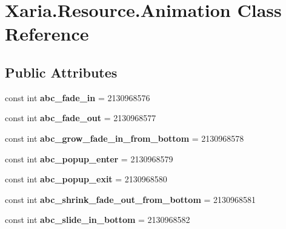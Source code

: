 \hypertarget{classXaria_1_1Resource_1_1Animation}{}\section{Xaria.\+Resource.\+Animation Class Reference}
\label{classXaria_1_1Resource_1_1Animation}
\subsection*{Public Attributes}
\begin{DoxyCompactItemize}
\item 
\mbox{\label{classXaria_1_1Resource_1_1Animation_a0caef95520f8407d50a7669f2417f583}} 
const int {\bfseries abc\+\_\+fade\+\_\+in} = 2130968576
\item 
\mbox{\label{classXaria_1_1Resource_1_1Animation_a36c091199021a97835a4d0897899b0d7}} 
const int {\bfseries abc\+\_\+fade\+\_\+out} = 2130968577
\item 
\mbox{\label{classXaria_1_1Resource_1_1Animation_a334d9047a5ee34f2c2b49a758719c622}} 
const int {\bfseries abc\+\_\+grow\+\_\+fade\+\_\+in\+\_\+from\+\_\+bottom} = 2130968578
\item 
\mbox{\label{classXaria_1_1Resource_1_1Animation_a8cea1052014eebc0dd0ad1b89eb16e18}} 
const int {\bfseries abc\+\_\+popup\+\_\+enter} = 2130968579
\item 
\mbox{\label{classXaria_1_1Resource_1_1Animation_a4c76faf68eaf8363f2494703ec730857}} 
const int {\bfseries abc\+\_\+popup\+\_\+exit} = 2130968580
\item 
\mbox{\label{classXaria_1_1Resource_1_1Animation_aab697de1f45b5120c8bd0c0ac38940ab}} 
const int {\bfseries abc\+\_\+shrink\+\_\+fade\+\_\+out\+\_\+from\+\_\+bottom} = 2130968581
\item 
\mbox{\label{classXaria_1_1Resource_1_1Animation_a62db4102280997a010fe103f5eaec34c}} 
const int {\bfseries abc\+\_\+slide\+\_\+in\+\_\+bottom} = 2130968582

\end{DoxyCompactItemize}
